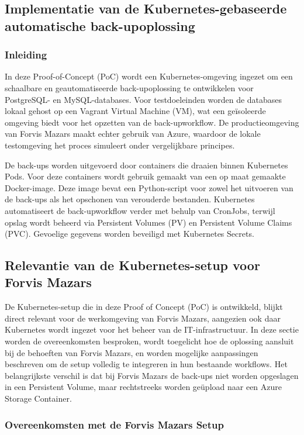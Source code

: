 \subsection{Implementatie van de Kubernetes-gebaseerde automatische back-upoplossing}

\subsubsection{Inleiding}
In deze Proof-of-Concept (PoC) wordt een Kubernetes-omgeving ingezet om een schaalbare en geautomatiseerde back-upoplossing te ontwikkelen voor PostgreSQL- en MySQL-databases. Voor testdoeleinden worden de databases lokaal gehost op een Vagrant Virtual Machine (VM), wat een geïsoleerde omgeving biedt voor het opzetten van de back-upworkflow. De productieomgeving van Forvis Mazars maakt echter gebruik van Azure, waardoor de lokale testomgeving het proces simuleert onder vergelijkbare principes.

De back-ups worden uitgevoerd door containers die draaien binnen Kubernetes Pods. Voor deze containers wordt gebruik gemaakt van een op maat gemaakte Docker-image. Deze image bevat een Python-script voor zowel het uitvoeren van de back-ups als het opschonen van verouderde bestanden. Kubernetes automatiseert de back-upworkflow verder met behulp van CronJobs, terwijl opslag wordt beheerd via Persistent Volumes (PV) en Persistent Volume Claims (PVC). Gevoelige gegevens worden beveiligd met Kubernetes Secrets.

\subsection{Relevantie van de Kubernetes-setup voor Forvis Mazars}

De Kubernetes-setup die in deze Proof of Concept (PoC) is ontwikkeld, blijkt direct relevant voor de werkomgeving van Forvis Mazars, aangezien ook daar Kubernetes wordt ingezet voor het beheer van de IT-infrastructuur. In deze sectie worden de overeenkomsten besproken, wordt toegelicht hoe de oplossing aansluit bij de behoeften van Forvis Mazars, en worden mogelijke aanpassingen beschreven om de setup volledig te integreren in hun bestaande workflows. Het belangrijkste verschil is dat bij Forvis Mazars de back-ups niet worden opgeslagen in een Persistent Volume, maar rechtstreeks worden geüpload naar een Azure Storage Container.

\subsubsection*{Overeenkomsten met de Forvis Mazars Setup}

